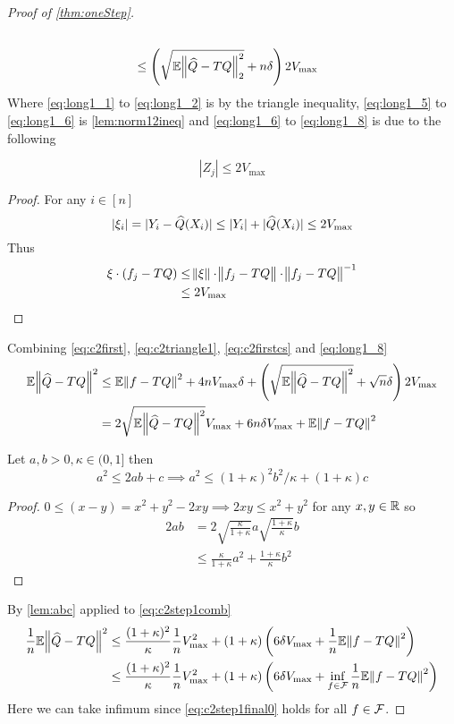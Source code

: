 \begin{proof}[Proof of \cref{thm:oneStep}]
\begin{align}
    \\ &\leq \left(\sqrt{\mathbb{E} \norm{\widehat{Q} -TQ}_2^2} + n \delta \right)
    2 V_{\max} 
    \label{eq:long1_8}
  \end{align}
  Where \cref{eq:long1_1} to \cref{eq:long1_2} is by the triangle inequality,
  \cref{eq:long1_5} to \cref{eq:long1_6} is \cref{lem:norm12ineq}
  and \cref{eq:long1_6} to \cref{eq:long1_8} is due to the following
  \begin{prop}
    \[ |Z_j| \leq 2 V_{\max} \]
  \end{prop}
  \begin{proof} For any $i \in [n]$
    \[ |\xi_i| = |Y_i - \widehat{Q}(X_i)| \leq |Y_i| + |\widehat{Q}(X_i)|
    \leq 2 V_{\max} \]
    Thus
    \begin{align*}
      \xi \cdot (f_j - TQ)
      & \leq \norm{\xi} \cdot \norm{f_j - TQ} \cdot \norm{f_j - TQ}^{-1}
      \\ & \leq 2 V_{\max} 
    \end{align*}
  \end{proof}
  Combining \cref{eq:c2first}, \cref{eq:c2triangle1},
  \cref{eq:c2firstcs} and \cref{eq:long1_8}
  \begin{align}
    \mathbb{E} \norm{\widehat{Q} - TQ}^2 & \leq \mathbb{E} \norm{f - TQ}^2 + 4 n V_{\max} \delta
    + \left( \sqrt{\mathbb{E} \norm{\widehat{Q} - TQ}^2} + \sqrt{n} \delta \right)
    2 V_{\max} 
    \\ & = 2 \sqrt{\mathbb{E} \norm{\widehat{Q} - TQ}^2} V_{\max} 
    + 6 n \delta V_{\max} + \mathbb{E} \norm{f - TQ}^2
    \label{eq:c2step1comb}
  \end{align}
  \begin{lem} Let $a,b>0, \kappa \in (0,1]$ then
    \[ a^2 \leq 2ab + c \implies a^2 \leq (1 + \kappa)^2 b^2 / \kappa
    + (1 + \kappa) c \]
    \label{lem:abc}
  \end{lem}
  \begin{proof} $0 \leq (x - y) = x^2 + y^2 - 2xy \implies 2xy \leq x^2 + y^2$
    for any $x, y \in \mathbb{R}$ so
    \begin{align*}
      2ab & = 2 \sqrt{\frac{\kappa}{1+\kappa}} a \sqrt{\frac{1+\kappa}{\kappa}} b
      \\ & \leq \frac{\kappa}{1+\kappa} a^2 + \frac{1 + \kappa}{\kappa} b^2
    \end{align*}
  \end{proof}
  By \cref{lem:abc} applied to \cref{eq:c2step1comb}
  \begin{align}
    \frac{1}{n} \mathbb{E} \norm{\widehat{Q} - TQ}^2
    & \leq \frac{(1+\kappa)^2}{\kappa} \frac{1}{n} V_{\max}^2
    + (1 + \kappa) \left( 6 \delta V_{\max}
    + \frac{1}{n} \mathbb{E} \norm{f - TQ}^2 \right)
    \label{eq:c2step1final0}
    \\ & \leq \frac{(1+\kappa)^2}{\kappa} \frac{1}{n} V_{\max}^2
    + (1 + \kappa) \left( 6 \delta V_{\max}
    + \inf_{f \in \mathcal{F}} \frac{1}{n} \mathbb{E} \norm{f - TQ}^2 \right)
    \label{eq:c2step1final}
  \end{align}
  Here we can take infimum since
  \cref{eq:c2step1final0} holds for all $f \in \mathcal{F}$.


\end{proof}
